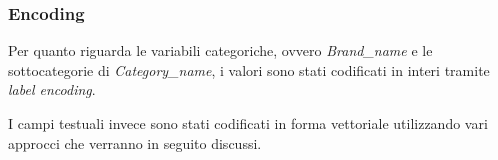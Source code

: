 \subsubsection{Encoding}

Per quanto riguarda le variabili categoriche, ovvero \textit{Brand\_name} e le
sottocategorie di \textit{Category\_name},
i valori sono stati codificati in interi tramite \textit{label encoding}.

I campi testuali invece sono stati codificati in forma vettoriale utilizzando
vari approcci che verranno in seguito discussi.


